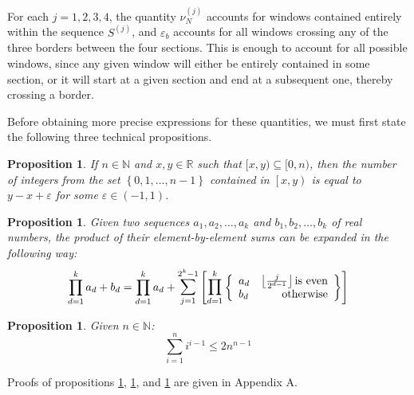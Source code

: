 \documentclass[11pt,a4paper]{tesis}
\theoremstyle{plain}
\newtheorem{proposition}[theorem]{Proposition}
\theoremstyle{definition}
\begin{document}
For each $j = 1, 2, 3, 4$, the quantity $\nu^{(j)}_N$ accounts for windows contained entirely within the sequence $S^{(j)}$, and $\varepsilon_b$ accounts for all windows crossing any of the three borders between the four sections. This is enough to account for all possible windows, since any given window will either be entirely contained in some section, or it will start at a given section and end at a subsequent one, thereby crossing a border.

Before obtaining more precise expressions for these quantities, we must first state the following three technical propositions.

\begin{proposition}\label{proposition:inequality-sandwich}
  If $n \in \mathbb{N}$ and $x, y \in \mathbb{R}$ such that $[x, y) \subseteq [0, n)$, then the number of integers from the set $\left \{ 0, 1, \dots, n - 1 \right \}$ contained in $\left[x, y\right)$ is equal to $y - x + \varepsilon$ for some $\varepsilon \in (-1, 1)$.
\end{proposition}

\begin{proposition}\label{proposition:product-of-sums}
  Given two sequences $a_1, a_2, \dots, a_k$ and $b_1, b_2, \dots, b_k$ of real numbers, the product of their element-by-element sums can be expanded in the following way:
  \begin{equation*}
    \prod_{d = 1}^{k} a_d + b_d = \prod_{d = 1}^{k} a_d + \mathlarger{\sum}_{j = 1}^{2^k - 1} \left [ \mathlarger{\prod}_{d = 1}^{k}
      \left \{ \begin{array}{lr}
        a_d & \left \lfloor \frac{j}{2^{d - 1}} \right \rfloor \text{is even} \\
        b_d & \text{otherwise}
      \end{array} \right \} \right ]
  \end{equation*}
\end{proposition}

\begin{proposition}\label{proposition:sum-i-to-the-i-m-1}
  Given $n \in \mathbb{N}$:
  \begin{equation*}
    \sum_{i = 1}^{n} i^{i - 1} \le 2 n^{n - 1}
  \end{equation*}
\end{proposition}

Proofs of propositions \ref{proposition:inequality-sandwich}, \ref{proposition:product-of-sums}, and \ref{proposition:sum-i-to-the-i-m-1} are given in Appendix A.
\end{document}
